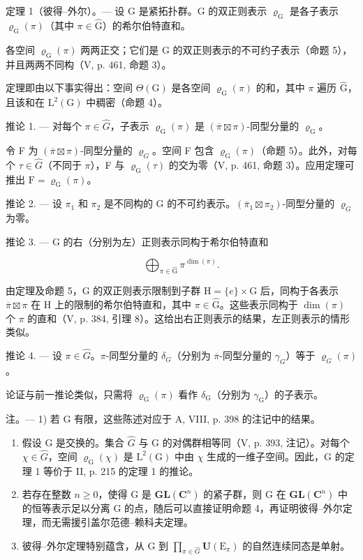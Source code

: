 定理 1（彼得--外尔）。--- 设 G 是紧拓扑群。G 的双正则表示 \(\varrho_{\mathrm{G}}\) 是各子表示 \(\varrho_{\mathrm{G}}(\pi)\)（其中 \(\pi \in \widehat{\mathrm{G}}\)）的希尔伯特直和。

各空间 \(\varrho_{\mathrm{G}}(\pi)\) 两两正交；它们是 G 的双正则表示的不可约子表示（命题 5），并且两两不同构（V, p. 461, 命题 3）。

定理即由以下事实得出：空间 \(\Theta(\mathrm{G})\) 是各空间 \(\varrho_{\mathrm{G}}(\pi)\) 的和，其中 \(\pi\) 遍历 \(\widehat{\mathrm{G}}\)，且该和在 \(\mathrm{L}^2(\mathrm{G})\) 中稠密（命题 4）。

推论 1. --- 对每个 \(\pi\in\widehat{G}\)，子表示 \(\varrho_{\mathrm{G}}(\pi)\) 是 \((\overline{\pi}\boxtimes\pi)\)-同型分量的 \(\varrho_{\mathrm{G}}\)。

令 F 为 \((\overline{\pi} \boxtimes \pi)\)-同型分量的 \(\varrho_{G}\)。空间 F 包含 \(\varrho_{\mathrm{G}}(\pi)\)（命题 5）。此外，对每个 \(\tau \in \widehat{G}\)（不同于 \(\pi\)），F 与 \(\varrho_{\mathrm{G}}(\tau)\) 的交为零（V, p. 461, 命题 3）。应用定理可推出 \(\mathrm{F} = \varrho_{\mathrm{G}}(\pi)\)。

推论 2. --- 设 \(\pi_1\) 和 \(\pi_2\) 是不同构的 G 的不可约表示。\((\overline{\pi}_1 \boxtimes \pi_2)\)-同型分量的 \(\varrho_G\) 为零。

推论 3. --- G 的右（分别为左）正则表示同构于希尔伯特直和

\[
\bigoplus_ {\pi \in \widehat {\mathrm{G}}} \pi^ {\dim (\pi)}.
\]

由定理及命题 5，G 的双正则表示限制到子群 \(\mathrm{H} = \{e\} \times \mathrm{G}\) 后，同构于各表示 \(\overline{\pi} \boxtimes \pi\) 在 H 上的限制的希尔伯特直和，其中 \(\pi \in \widehat{\mathrm{G}}\)。这些表示同构于 \(\dim(\pi)\) 个 \(\pi\) 的直和（V, p. 384, 引理 8）。这给出右正则表示的结果，左正则表示的情形类似。

推论 4. --- 设 \(\pi\in\widehat{G}\)。\(\pi\)-同型分量的 \(\delta_{G}\)（分别为 \(\overline{\pi}\)-同型分量的 \(\gamma_{G}\)）等于 \(\varrho_{G}(\pi)\)。

论证与前一推论类似，只需将 \(\varrho_{\mathrm{G}}(\pi)\) 看作 \(\delta_{\mathrm{G}}\)（分别为 \(\gamma_{\mathrm{G}}\)）的子表示。

注。--- 1) 若 G 有限，这些陈述对应于 A, VIII, p. 398 的注记中的结果。

\begin{enumerate}
\def\labelenumi{\arabic{enumi})}
\setcounter{enumi}{1}
\item
  假设 G 是交换的。集合 \(\widehat{G}\) 与 G 的对偶群相等同（V, p. 393, 注记）。对每个 \(\chi \in \widehat{G}\)，空间 \(\varrho_{\mathrm{G}}(\chi)\) 是 \(\mathrm{L}^2 (\mathrm{G})\) 中由 \(\chi\) 生成的一维子空间。因此，G 的定理 1 等价于 II, p. 215 的定理 1 的推论。
\item
  若存在整数 \(n \geqslant 0\)，使得 G 是 \(\mathbf{GL}(\mathbf{C}^{n})\) 的紧子群，则 G 在 \(\mathbf{GL}(\mathbf{C}^{n})\) 中的恒等表示足以分离 G 的点，随后可以直接证明命题 4，再证明彼得–外尔定理，而无需援引盖尔范德–赖科夫定理。
\item
  彼得–外尔定理特别蕴含，从 G 到 \(\prod_{\pi\in\widehat{G}}\mathbf{U}(\mathrm{E}_{\pi})\) 的自然连续同态是单射。
\end{enumerate}

